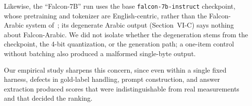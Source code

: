 Likewise, the ``Falcon-7B'' run uses the base \texttt{falcon-7b-instruct} checkpoint,
whose pretraining and tokenizer are English-centric, rather than the Falcon-Arabic
system of~\cite{falconarabic}; its degenerate Arabic output (Section~VI-C) says nothing
about Falcon-Arabic. We did not isolate whether the degeneration stems from the
checkpoint, the 4-bit quantization, or the generation path; a one-item control without
batching also produced a malformed single-byte output.

Our empirical study sharpens this concern, since even within a single fixed harness,
defects in gold-label handling, prompt construction, and answer extraction produced
scores that were indistinguishable from real measurements and that decided the ranking.

